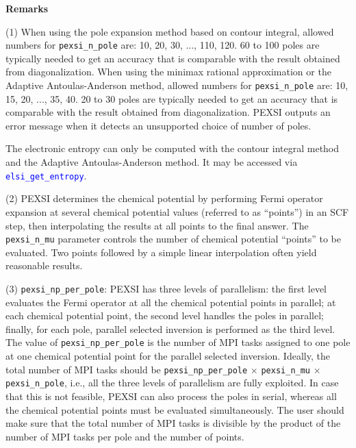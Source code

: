 \documentclass{report}
\newcommand{\api}[1]{\textcolor{blue}{\texttt{#1}}}
\begin{document}
\textbf{Remarks}

(1) When using the pole expansion method based on contour integral, allowed numbers for \texttt{pexsi\_n\_pole} are: 10, 20, 30, ..., 110, 120. 60 to 100 poles are typically needed to get an accuracy that is comparable with the result obtained from diagonalization. When using the minimax rational approximation or the Adaptive Antoulas-Anderson method, allowed numbers for \texttt{pexsi\_n\_pole} are: 10, 15, 20, ..., 35, 40. 20 to 30 poles are typically needed to get an accuracy that is comparable with the result obtained from diagonalization. PEXSI outputs an error message when it detects an unsupported choice of number of poles.

The electronic entropy can only be computed with the contour integral method and the Adaptive Antoulas-Anderson method. It may be accessed via \api{elsi\_get\_entropy}.

(2) PEXSI determines the chemical potential by performing Fermi operator expansion at several chemical potential values (referred to as ``points'') in an SCF step, then interpolating the results at all points to the final answer. The \texttt{pexsi\_n\_mu} parameter controls the number of chemical potential ``points'' to be evaluated. Two points followed by a simple linear interpolation often yield reasonable results.

(3) \texttt{pexsi\_np\_per\_pole}: PEXSI has three levels of parallelism: the first level evaluates the Fermi operator at all the chemical potential points in parallel; at each chemical potential point, the second level handles the poles in parallel; finally, for each pole, parallel selected inversion is performed as the third level. The value of \texttt{pexsi\_np\_per\_pole} is the number of MPI tasks assigned to one pole at one chemical potential point for the parallel selected inversion. Ideally, the total number of MPI tasks should be \texttt{pexsi\_np\_per\_pole} $\times$ \texttt{pexsi\_n\_mu} $\times$ \texttt{pexsi\_n\_pole}, i.e., all the three levels of parallelism are fully exploited. In case that this is not feasible, PEXSI can also process the poles in serial, whereas all the chemical potential points must be evaluated simultaneously. The user should make sure that the total number of MPI tasks is divisible by the product of the number of MPI tasks per pole and the number of points.
\end{document}
